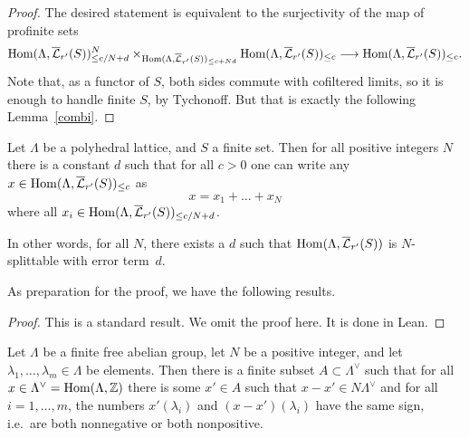 \begin{proof}
  \leanok
  The desired statement is equivalent to the surjectivity of the map of profinite sets
  \[
    \operatorname{Hom}(\Lambda,\overline{\mathcal L}_{r'}(S))_{\leq c/N+d}^N\times_{\operatorname{Hom}(\Lambda,\overline{\mathcal L}_{r'}(S))_{\leq c+Nd}} \operatorname{Hom}(\Lambda,\overline{\mathcal L}_{r'}(S))_{\leq c} \longrightarrow
    \operatorname{Hom}(\Lambda,\overline{\mathcal L}_{r'}(S))_{\leq c}.
  \]
  Note that, as a functor of $S$, both sides commute with cofiltered limits, so it is enough to handle finite $S$, by Tychonoff.
  But that is exactly the following Lemma~\ref{combi}.
\end{proof}

\begin{lemma}
  \label{combi}
  \leanok
  Let $\Lambda$ be a polyhedral lattice, and $S$ a finite set.
  Then for all positive integers $N$ there is a constant $d$
  such that for all $c>0$ one can write any
  $x\in \operatorname{Hom}(\Lambda,\overline{\mathcal L}_{r'}(S))_{\leq c}$ as
  \[
    x=x_1+\ldots+x_N
  \]
  where all $x_i\in \operatorname{Hom}(\Lambda,\overline{\mathcal L}_{r'}(S))_{\leq c/N+d}$.

  In other words, for all $N$, there exists a $d$ such that
  $\operatorname{Hom}(\Lambda, \overline{\mathcal L}_{r'}(S))$ is $N$-splittable with error term~$d$.
\end{lemma}

As preparation for the proof, we have the following results.


\begin{proof}
  \leanok
  This is a standard result. We omit the proof here. It is done in Lean.
\end{proof}

\begin{lemma}
  \label{combi_aux}
  \leanok
  Let $\Lambda$ be a finite free abelian group,
  let $N$ be a positive integer,
  and let $\lambda_1,\ldots,\lambda_m\in \Lambda$ be elements.
  Then there is a finite subset $A\subset \Lambda^\vee$
  such that for all $x\in \Lambda^\vee=\operatorname{Hom}(\Lambda,\mathbb Z)$
  there is some $x'\in A$ such that $x-x'\in N\Lambda^\vee$
  and for all $i=1,\ldots,m$,
  the numbers $x'(\lambda_i)$ and $(x-x')(\lambda_i)$ have the same sign,
  i.e.~are both nonnegative or both nonpositive.
\end{lemma}

